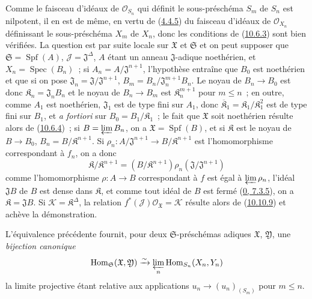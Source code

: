 Comme le faisceau d'idéaux de $\mathscr{O}_{S_n}$ qui définit le
sous-préschéma $S_m$ de $S_n$ est nilpotent, il en est de même, en vertu de
(\hyperref[I.4.4.5-fr]{4.4.5}) du faisceau d'idéaux de
$\mathscr{O}_{X_n}$ définissant le sous-préschéma $X_m$ de $X_n$, donc les
conditions de (\hyperref[I.10.6.3-fr]{10.6.3}) sont bien vérifiées. La
question est par suite locale sur $\mathfrak{X}$ et $\mathfrak{S}$ et on
peut supposer que $\mathfrak{S}=\operatorname{Spf}(A)$,
$\mathscr{J}=\mathfrak{J}^\Delta$, $A$ étant un anneau $\mathfrak{J}$-adique
noethérien, et $X_n=\operatorname{Spec}(B_n)$~; si
$A_n=A/\mathfrak{J}^{n+1}$, l'hypothèse entraîne que $B_0$ est noethérien et
que si on pose $\mathfrak{J}_n=\mathfrak{J}/\mathfrak{J}^{n+1}$,
$B_m=B_n/\mathfrak{J}_n^{m+1}B_n$. Le noyau de $B_n\to B_0$ est donc
$\mathfrak{K}_n=\mathfrak{J}_nB_n$ et le noyau de $B_n\to B_m$ est
$\mathfrak{K}_n^{m+1}$ pour $m\leq n$~; en outre, comme $A_1$ est
noethérien, $\mathfrak{J}_1$ est de type fini sur $A_1$, donc
$\overline{\mathfrak{K}}_1=\mathfrak{K}_1/\mathfrak{K}_1^2$ est de type fini
sur $B_1$, et \emph{a fortiori} sur
$B_0=B_1/\mathfrak{K}_1$~; le fait que $\mathfrak{X}$ soit noethérien
résulte alors de (\hyperref[I.10.6.4-fr]{10.6.4})~; si
$B=\varprojlim B_n$, on a $\mathfrak{X}=\operatorname{Spf}(B)$, et si
$\mathfrak{K}$ est le noyau de $B\to B_0$,
$B_n=B/\mathfrak{K}^{n+1}$. Si
$\rho_n:A/\mathfrak{J}^{n+1}\to B/\mathfrak{K}^{n+1}$ est l'homomorphisme
correspondant à $f_n$, on a donc
\[
  \mathfrak{K}/\mathfrak{K}^{n+1}
  =(B/\mathfrak{K}^{n+1})\rho_n(\mathfrak{J}/\mathfrak{J}^{n+1})
\]
comme l'homomorphisme $\rho:A\to B$ correspondant à $f$ est égal à
$\varprojlim\rho_n$, l'idéal $\mathfrak{J}B$ de $B$ est dense dans
$\mathfrak{K}$, et comme tout idéal de $B$ est fermé
(\hyperref[0.7.3.5-fr]{0, 7.3.5}), on a $\mathfrak{K}=\mathfrak{J}B$. Si
$\mathscr{K}=\mathfrak{K}^\Delta$, la relation
$f^*(\mathscr{J})\mathscr{O}_{\mathfrak{X}}=\mathscr{K}$ résulte alors de
(\hyperref[I.10.10.9-fr]{10.10.9}) et achève la démonstration.

\begin{env}[10.12.3.2]
\label{I.10.12.3.2-fr}
L'équivalence précédente fournit, pour deux $\mathfrak{S}$-préschémas
adiques $\mathfrak{X}$, $\mathfrak{Y}$, une \emph{bijection canonique}
\[
  \operatorname{Hom}_{\mathfrak{S}}(\mathfrak{X},\mathfrak{Y})
  \xrightarrow{\sim}
  \varprojlim_n\operatorname{Hom}_{S_n}(X_n,Y_n)
\]
la limite projective étant relative aux applications
$u_n\to(u_n)_{(S_m)}$ pour $m\leq n$.
\end{env}

